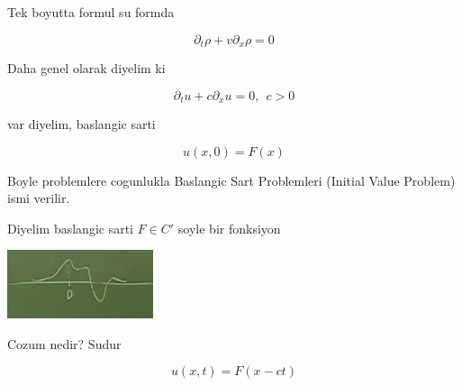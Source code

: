 \documentclass[12pt,fleqn]{article}
\begin{document}
Tek boyutta formul su formda

\[ \partial_t \rho + v \partial_x \rho = 0 \]

Daha genel olarak diyelim ki 

\[ \partial_t u + c\partial_x u = 0, \ \ c>0 \]

var diyelim, baslangic sarti

\[ u(x,0) = F(x) \]

Boyle problemlere cogunlukla Baslangic Sart Problemleri (Initial Value
Problem) ismi verilir. 

Diyelim baslangic sarti $F \in C'$  soyle bir fonksiyon

\includegraphics[height=2cm]{1_3.png}

Cozum nedir? Sudur 

\[ u(x,t) = F(x-ct) \]
\end{document}
